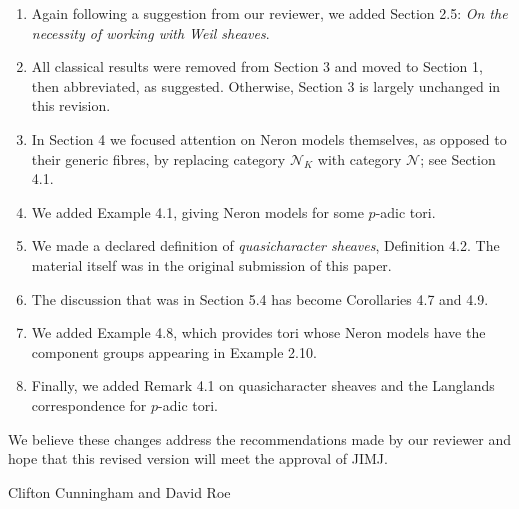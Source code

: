 \documentclass[a4, 10pt]{amsart}
\theoremstyle{definition}
\theoremstyle{remark}
\begin{document}
\begin{enumerate}
\item
Again following a suggestion from our reviewer, we added Section 2.5: {\it On the necessity of working with Weil sheaves}.
\item
All classical results were removed from Section 3 and moved to Section 1, then abbreviated, as suggested. Otherwise, Section 3 is largely unchanged in this revision.
\item
In Section 4 we focused attention on Neron models themselves, as opposed to their generic fibres, by replacing category $\mathcal{N}_K$ with category $\mathcal{N}$; see Section 4.1.
\item 
We added Example 4.1, giving Neron models for some $p$-adic tori.
\item
We made a declared definition of {\it quasicharacter sheaves}, Definition 4.2. The material itself was in the original submission of this paper.
\item
The discussion that was in Section 5.4 has become Corollaries 4.7 and 4.9.
\item
We added Example 4.8, which provides tori whose Neron models have the component groups appearing in Example 2.10.
\item
Finally, we added Remark 4.1 on quasicharacter sheaves and the Langlands correspondence for $p$-adic tori. 
\end{enumerate}

We believe these changes address the recommendations made by our reviewer and hope that this revised version will meet the approval of JIMJ.

\vskip0.3cm
\vskip0.4cm
\centerline{Clifton Cunningham and David Roe}
\end{document}
